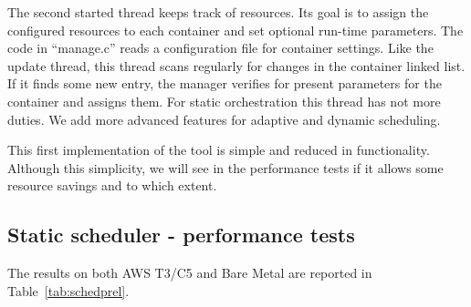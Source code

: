 \documentclass[]{scrartcl}
\begin{document}
The second started thread keeps track of resources. Its goal is to assign the configured resources to each container and set optional run-time parameters.
The code in ``manage.c'' reads a configuration file for container settings.
Like the update thread, this thread scans regularly for changes in the container linked list. 
If it finds some new entry, the manager verifies for present parameters for the container and assigns them.
For static orchestration this thread has not more duties. We add more advanced features for adaptive and dynamic scheduling. 

This first implementation of the tool is simple and reduced in functionality. Although this simplicity, we will see in the performance tests if it allows some resource savings and to which extent.

\subsection{Static scheduler - performance tests}

The results on both AWS T3/C5 and Bare Metal are reported in Table~\ref{tab:schedprel}.
\end{document}
